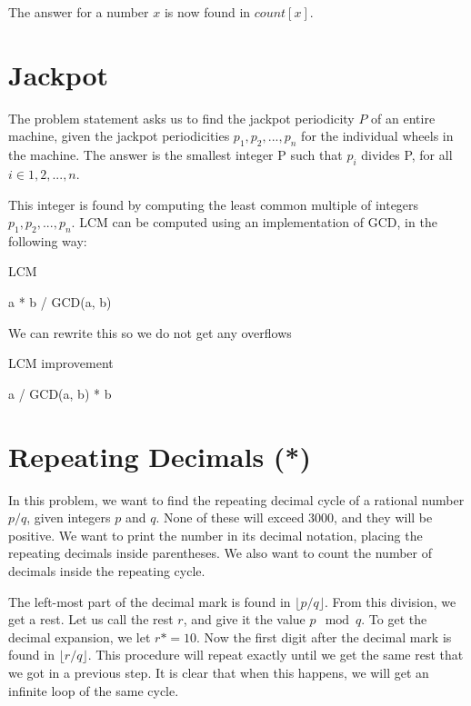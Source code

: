 \documentclass[11pt,a4paper,twoside]{article}
\begin{document}
The answer for a number $x$ is now found in $count[x]$.
\section{Jackpot}

The problem statement asks us to find the jackpot periodicity $P$ of an entire machine, given the jackpot periodicities $p_{1},p_{2},...,p_{n}$ for the individual wheels in the machine. The answer is the smallest integer P such that $p_{i}$ divides P, for all $i \in {1,2,...,n}$.

This integer is found by computing the least common multiple of integers $p_{1},p_{2},...,p_{n}$. LCM can be computed using an implementation of GCD, in the following way:

\begin{algorithm}
    \caption{LCM}
    \label{LCM}
    \begin{algorithmic}
        \STATE a * b / GCD(a, b)
    \end{algorithmic}
\end{algorithm}


We can rewrite this so we do not get any overflows

\begin{algorithm}
    \caption{LCM improvement}
    \label{LCM improvement}
    \begin{algorithmic}
        \STATE a / GCD(a, b) * b
    \end{algorithmic}
\end{algorithm}





\section{Repeating Decimals (*)}

In this problem, we want to find the repeating decimal cycle of a rational
number $p/q$, given integers $p$ and $q$. None of these will exceed $3000$, and
they will be positive. We want to print the number in its decimal notation,
placing the repeating decimals inside parentheses. We also want to count the
number of decimals inside the repeating cycle.

The left-most part of the decimal mark is found in $\lfloor{p/q}\rfloor$. From this
division, we get a rest. Let us call the rest $r$, and give it the value $p
\mod q$. To get the decimal expansion, we let $r *= 10$. Now the first digit
after the decimal mark is found in $\lfloor{r/q}\rfloor$. This procedure will repeat
exactly until we get the same rest that we got in a previous step. It is clear
that when this happens, we will get an infinite loop of the same cycle.
\end{document}
